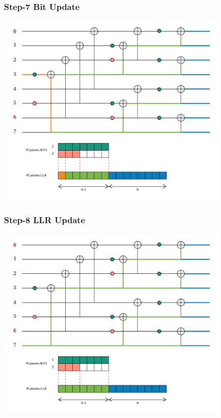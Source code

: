 \documentclass{beamer}
\begin{document}
\begin{frame}
\frametitle{Step-7 Bit Update}
  \begin{center}
  \includegraphics[width=0.85\textwidth]{pics/polar_-_SC_bit_7.png}
  \end{center}
\end{frame}

\begin{frame}
\frametitle{Step-8 LLR Update}
  \begin{center}
  \includegraphics[width=0.85\textwidth]{pics/polar_-_SC_llr_8.png}
  \end{center}
\end{frame}
\end{document}
